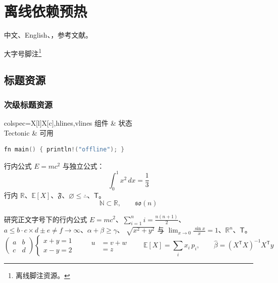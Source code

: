 \documentclass[fontset=fandol]{ctexbook}
\begin{document}
\tableofcontents
\chapter{离线依赖预热}

中文、English、，参考文献\cite{warmup2026}。

{\fontsize{14.05249pt}{24pt}\selectfont 大字号脚注\footnote{离线脚注资源。}}

\section{标题资源}
\subsection{次级标题资源}

\begin{longtblr}{colspec={X[l]X[c]},hlines,vlines}
组件 & 状态 \\
Tectonic & 可用
\end{longtblr}


\begin{lstlisting}[language=C]
fn main() { println!("offline"); }
\end{lstlisting}

行内公式 $E=mc^2$ 与独立公式：
\[
  \int_0^1 x^2\,dx = \frac{1}{3}
\]
行内 $\mathbb{R}$、$\mathbb{E}[X]$、$\mathfrak{F}$、$\varnothing \leqslant \therefore$、$\mathsf{T}$。
\[
  \mathbb{N} \subset \mathbb{R}, \qquad \mathfrak{so}(n)
\]

{\fontsize{14.05249pt}{24pt}\selectfont
研究正文字号下的行内公式 $E=mc^2$、$\sum_{i=1}^{n} i = \frac{n(n+1)}{2}$、
$a \leq b \cdot c \times d \pm e \neq f \to \infty$、$\alpha + \beta \geq \gamma$、
$\sqrt{x^2+y^2}$ 与 $\lim_{x \to 0} \frac{\sin x}{x} = 1$、$\mathbb{R}^n$、$\mathsf{T}$。
\[
  \begin{pmatrix} a & b \\ c & d \end{pmatrix}
  \begin{cases} x + y = 1 \\ x - y = 2 \end{cases}
  \qquad
  \begin{aligned} u &= v + w \\ &= z \end{aligned}
  \qquad
  \mathbb{E}[X] = \sum_{i} x_i\,p_i, \qquad \hat\beta = (X^{\mathsf{T}}X)^{-1}X^{\mathsf{T}}y
\]}
\end{document}

